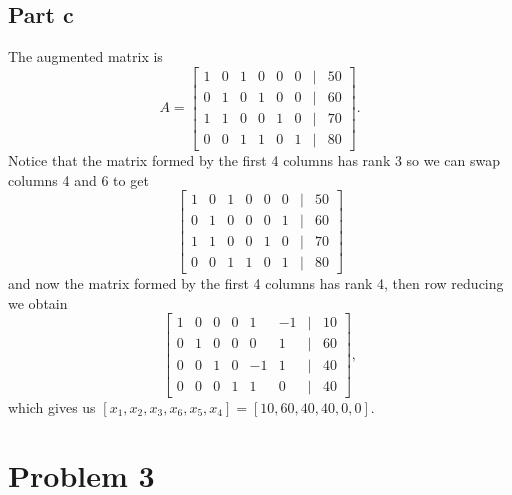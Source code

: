 \documentclass{article}
\begin{document}
\subsection*{Part c}
The augmented matrix is
\[
A=\begin{bmatrix}
1 & 0 & 1 & 0 & 0 & 0 & | & 50\\
0 & 1 & 0 & 1 & 0 & 0 & | & 60\\
1 & 1 & 0 & 0 & 1 & 0 & | & 70\\
0 & 0 & 1 & 1 & 0 & 1 & | & 80
\end{bmatrix}.
\]
Notice that the matrix formed by the first 4 columns has rank 3 so we can swap
columns 4 and 6 to get
\[
\begin{bmatrix}
1 & 0 & 1 & 0 & 0 & 0 & | & 50\\
0 & 1 & 0 & 0 & 0 & 1 & | & 60\\
1 & 1 & 0 & 0 & 1 & 0 & | & 70\\
0 & 0 & 1 & 1 & 0 & 1 & | & 80
\end{bmatrix}
\]
and now the matrix formed by the first 4 columns has rank 4, then row reducing
we obtain
\[
\begin{bmatrix}
1 & 0 & 0 & 0 &  1 & -1 & | & 10\\
0 & 1 & 0 & 0 &  0 &  1 & | & 60\\
0 & 0 & 1 & 0 & -1 &  1 & | & 40\\
0 & 0 & 0 & 1 &  1 &  0 & | & 40
\end{bmatrix},
\]
which gives us $[x_1,x_2,x_3,x_6,x_5,x_4]=[10,60,40,40,0,0]$.
\section*{Problem 3}
\end{document}

